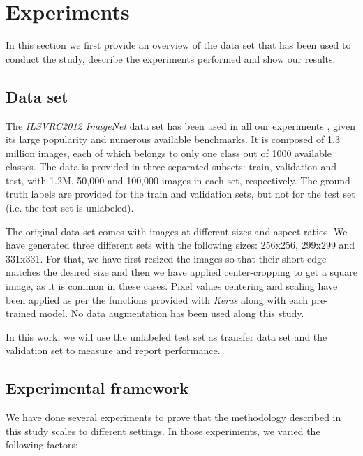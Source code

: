 \section{Experiments} \label{sec:distillation_experiments}
In this section we first provide an overview of the data set that has been used to conduct the study, describe the experiments performed and show our results.

\subsection{Data set}
The \textit{ILSVRC2012 ImageNet} data set has been used in all our experiments \cite{ILSVRC15}, given its large popularity and numerous available benchmarks. It is composed of 1.3 million images,  each of which belongs to only one class out of 1000 available classes. The data is provided in three separated subsets: train, validation and test, with 1.2M, 50,000 and 100,000 images in each set, respectively. The ground truth labels are provided for the train and validation sets, but not for the test set (i.e. the test set is unlabeled).

The original data set comes with images at different sizes and aspect ratios. We have generated three different sets with the following sizes: 256x256, 299x299 and 331x331. For that, we have first resized the images so that their short edge matches the desired size and then we have applied center-cropping to get a square image, as it is common in these cases. Pixel values centering and scaling have been applied as per the functions provided with \textit{Keras} along with each pre-trained model. No data augmentation has been used along this study.

In this work, we will use the unlabeled test set as transfer data set and the validation set to measure and report performance.

\subsection{Experimental framework}
We have done several experiments to prove that the methodology described in this study scales to different settings. In those experiments, we varied the following factors:

